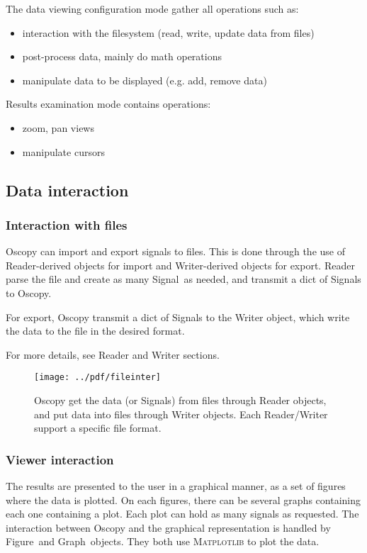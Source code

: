 \documentclass[a4paper,11pt]{article}
\newcommand{\cls}[1]{\textsf{#1}}
\newcommand{\sig}{\cls{Signal}}
\newcommand{\module}[1]{\textsc{#1}}
\newcommand{\graph}{\cls{Graph}}
\newcommand{\fig}{\cls{Figure}}
\begin{document}
The data viewing configuration mode gather all operations such as:
\begin{itemize}
\item interaction with the filesystem (read, write, update data from files)
\item post-process data, mainly do math operations
\item manipulate data to be displayed (e.g. add, remove data)
\end{itemize}
Results examination mode contains operations:
\begin{itemize}
\item zoom, pan views
\item manipulate cursors
\end{itemize}

\subsection{Data interaction}
\label{sec:data}

\subsubsection{Interaction with files}
\label{sec:fileinter}
Oscopy can import and export signals to files.
This is done through the use of Reader-derived objects for import and Writer-derived objects for export.
Reader parse the file and create as many \sig\ as needed, and transmit a dict of \sig s to Oscopy.

For export, Oscopy transmit a dict of \sig s to the Writer object, which write the data to the file in the desired format.

For more details, see Reader and Writer sections.

\begin{figure}[htbp]
  \centering
  \texttt{[image: ../pdf/fileinter]}
  \caption{Oscopy get the data (or \sig s) from files through Reader objects, and put data into files through Writer objects. Each Reader/Writer support a specific file format.}
  \label{fig:fileinter}
\end{figure}

\subsubsection{Viewer interaction}
\label{sec:viewinter}
The results are presented to the user in a graphical manner, as a set of figures where the data is plotted.
On each figures, there can be several graphs containing each one containing a plot.
Each plot can hold as many signals as requested.
The interaction between Oscopy and the graphical representation is handled by \fig\ and \graph\ objects.
They both use \module{Matplotlib} to plot the data.
\end{document}
